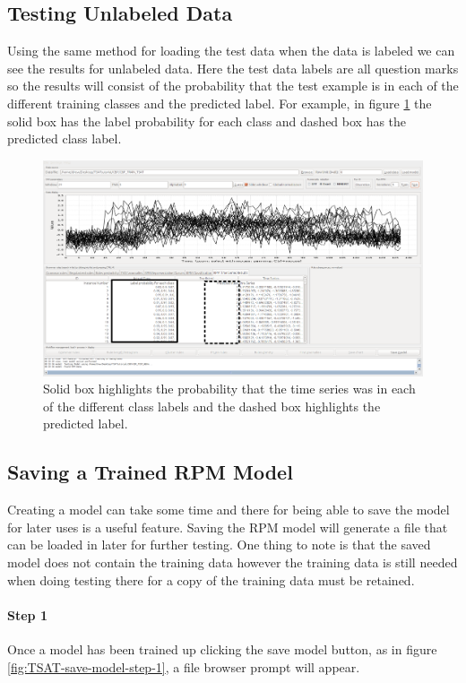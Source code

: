 \documentclass[letterpaper, 12pt]{article}
\begin{document}
\subsection{Testing Unlabeled Data}
Using the same method for loading the test data when the data is labeled we can see the results for unlabeled data.  Here the test data labels are all question marks so the results will consist of the probability that the test example is in each of the different training classes and the predicted label.  For example, in figure \ref{fig:TSAT-Results-Unknown-Test} the solid box has the label probability for each class and dashed box has the predicted class label.
\begin{figure}[H]
	\includegraphics[width=\textwidth]{RPMTimeSeriesResultsUnknown}
	\caption{Solid box highlights the probability that the time series was in each of the different class labels and the dashed box highlights the predicted label.}
	\label{fig:TSAT-Results-Unknown-Test}
\end{figure}

\subsection{Saving a Trained RPM Model}
\label{RPMSaving}
Creating a model can take some time and there for being able to save the model for later uses is a useful feature. Saving the RPM model will generate a file that can be loaded in later for further testing. One thing to note is that the saved model does not contain the training data however the training data is still needed when doing testing there for a copy of the training data must be retained.

\paragraph{Step 1}
Once a model has been trained up clicking the save model button, as in figure \ref{fig:TSAT-save-model-step-1}, a file browser prompt will appear.
\end{document}
